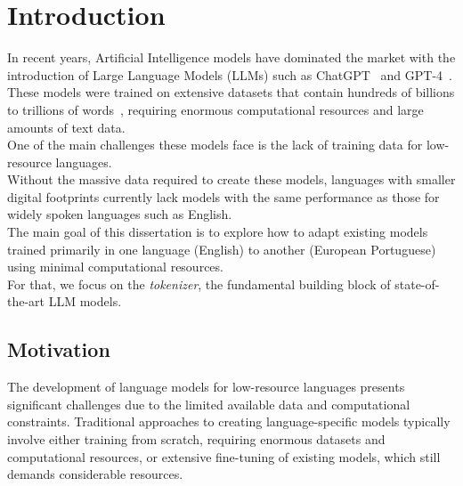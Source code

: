 
\chapter{Introduction}


\label{Section1}

In recent years, Artificial Intelligence models have dominated the market with the introduction of Large Language Models (LLMs) such as ChatGPT~\cite{openaiChatGPT} and GPT-4~\cite{openaiGPT4}.\\
These models were trained on extensive datasets that contain hundreds of billions to trillions of words~\cite{brown2020, touvron2023}, requiring enormous computational resources and large amounts of text data.\\
One of the main challenges these models face is the lack of training data for low-resource languages. \\
Without the massive data required to create these models, languages with smaller digital footprints currently lack models with the same performance as those for widely spoken languages such as English.\\
The main goal of this dissertation is to explore how to adapt existing models trained primarily in one language (English) to another (European Portuguese) using minimal computational resources.\\
For that, we focus on the \textit{tokenizer}, the fundamental building block of state-of-the-art LLM models.

\section{Motivation}\label{Section1.1}
The development of language models for low-resource languages presents significant challenges due to the limited available data and computational constraints. Traditional approaches to creating language-specific models typically involve either training from scratch, requiring enormous datasets and computational resources, or extensive fine-tuning of existing models, which still demands considerable resources.

